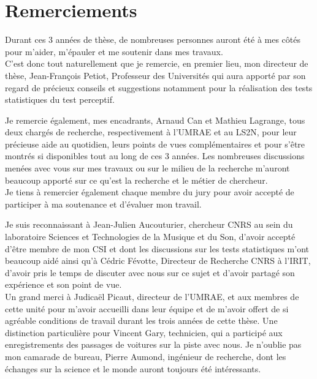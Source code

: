 \chapter*{Remerciements}


Durant ces 3 années de thèse, de nombreuses personnes auront été à mes côtés pour m'aider, m'épauler et me soutenir dans mes travaux. \\

C'est donc tout naturellement que je remercie, en premier lieu, mon directeur de thèse, Jean-François Petiot, Professeur des Universités qui aura apporté par son regard de précieux conseils et suggestions notamment pour la réalisation des tests statistiques du test perceptif.

Je remercie également, mes encadrants, Arnaud Can et Mathieu Lagrange, tous deux chargés de recherche, respectivement à l'UMRAE et au LS2N, pour leur précieuse aide au quotidien, leurs points de vues complémentaires et pour s'être montrés si disponibles tout au long de ces 3 années. Les nombreuses discussions menées avec vous sur mes travaux ou sur le milieu de la recherche m'auront beaucoup apporté sur ce qu'est la recherche et le métier de chercheur. \\

Je tiens à remercier également chaque membre du jury pour avoir accepté de participer à ma soutenance et d'évaluer mon travail.

Je suis reconnaissant à Jean-Julien Aucouturier, chercheur CNRS au sein du laboratoire Sciences et Technologies de la Musique et du Son, d'avoir accepté d'être membre de mon CSI et dont les discussions sur les tests statistiques m'ont beaucoup aidé ainsi qu'à Cédric Févotte, Directeur de Recherche CNRS à l'IRIT, d'avoir pris le temps de discuter avec nous sur ce sujet et d'avoir partagé son expérience et son point de vue. \\

Un grand merci à Judicaël Picaut, directeur de l'UMRAE, et aux membres de cette unité pour m'avoir accueilli dans leur équipe et de m'avoir offert de si agréable conditions de travail durant les trois années de cette thèse. Une distinction particulière pour Vincent Gary, technicien, qui a participé aux enregistrements des passages de voitures sur la piste avec nous. Je n'oublie pas mon camarade de bureau, Pierre Aumond, ingénieur de recherche, dont les échanges sur la science et le monde auront toujours été intéressants. \\

